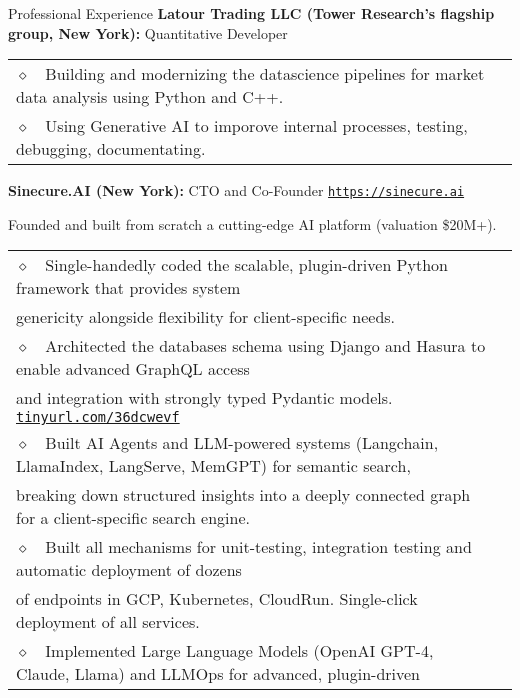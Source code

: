 \begin{rubric}{Professional Experience}
\entry*[2024-2025]%
\textbf{Latour Trading LLC (Tower Research's flagship group, New York):} Quantitative Developer
\par
  {\renewcommand{\arraystretch}{1}%
    \begin{tabular}{>{}l<{}@{\hspace{5pt}}%
    p{}}
      $\diamond$~~Building and modernizing the datascience pipelines for market data analysis using Python and C++. \\
      $\diamond$~~Using Generative AI to imporove internal processes, testing, debugging, documentating. \\
    \end{tabular}%
   }
%
\entry*[2021-2024]%
\textbf{Sinecure.AI (New York):} CTO and Co-Founder \href{https://sinecure.ai}{\texttt{https://sinecure.ai}}
\par{Founded and built from scratch a cutting-edge AI platform (valuation \$20M+).}
\par
  {\renewcommand{\arraystretch}{1}%
    \begin{tabular}{>{}l<{}@{\hspace{5pt}}%
    p{}}
      $\diamond$~~Single-handedly coded the scalable, plugin-driven Python framework that provides system \\
      genericity alongside flexibility for client-specific needs. \\
      $\diamond$~~Architected the databases schema using Django and Hasura to enable advanced GraphQL access \\
      and integration with strongly typed Pydantic models. \href{http://tinyurl.com/36dcwevf}{\texttt{tinyurl.com/36dcwevf}} \\
      $\diamond$~~Built AI Agents and LLM-powered systems (Langchain, LlamaIndex, LangServe, MemGPT) for semantic search, \\
      breaking down structured insights into a deeply connected graph for a client-specific search engine. \\
      $\diamond$~~Built all mechanisms for unit-testing, integration testing and automatic deployment of dozens \\
      of endpoints in GCP, Kubernetes, CloudRun. Single-click deployment of all services. \\
      $\diamond$~~Implemented Large Language Models (OpenAI GPT-4, Claude, Llama) and LLMOps for advanced, plugin-driven \\ 

\end{tabular}}
\end{rubric}

